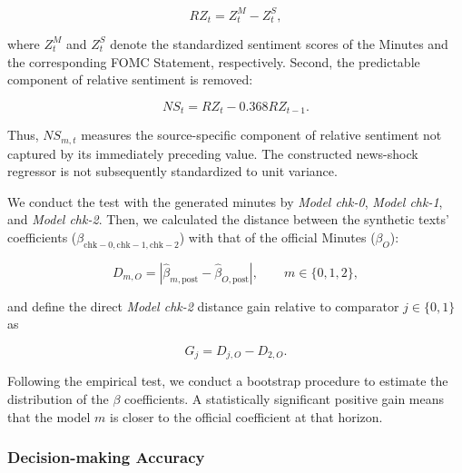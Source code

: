 \begin{equation}
\label{eq:ch2:relative_sentiment}
RZ_t
=
Z_t^M-Z_t^S,
\end{equation}

where \(Z_t^M\) and \(Z_t^S\) denote the standardized sentiment scores of the Minutes and the corresponding FOMC Statement, respectively. Second, the predictable component of relative sentiment is removed:

\begin{equation}
\label{eq:ch2:minutes_news_shock}
NS_t
=
RZ_t-0.368RZ_{t-1}.
\end{equation}

Thus, \(NS_{m,t}\) measures the source-specific component of relative sentiment not captured by its immediately preceding value. The constructed news-shock
regressor is not subsequently standardized to unit variance.


We conduct the test with the generated minutes by \textit{Model chk-0}, \textit{Model chk-1}, and \textit{Model chk-2}. Then, we calculated the distance  between the synthetic texts' coefficients ($\beta_{\mathrm{chk-0, chk-1, chk-2}}$) with that of the official Minutes ($\beta_{O}$):

\begin{equation}
\label{eq:ch2:tadle_beta_distance}
D_{m,O}
=
\left|
\widehat{\beta}_{m,\mathrm{post}}
-
\widehat{\beta}_{O,\mathrm{post}}
\right|,
\qquad m\in\{0,1,2\},
\end{equation}

and define the direct \textit{Model chk-2} distance gain relative to comparator
\(j\in\{0,1\}\) as

\begin{equation}
\label{eq:ch2:tadle_beta_gain}
G_j=D_{j,O}-D_{2,O}.
\end{equation}


Following the empirical test, we conduct a bootstrap procedure to estimate the distribution of the $\beta$ coefficients. A statistically significant positive gain means that the model $m$ is closer to the official coefficient at that horizon. 






\subsubsection*{Decision-making Accuracy}

